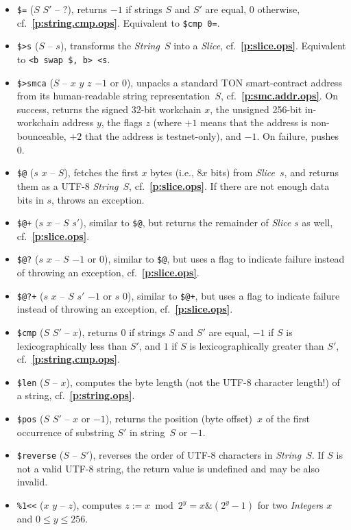 \documentclass[12pt,oneside]{article}
\def\refpoint#1{{\rm\textbf{\ref{#1}}}}
\let\ptref=\refpoint
\begin{document}
\begin{itemize}
\item {\tt \$=} ($S$ $S'$ -- $?$), returns $-1$ if strings $S$ and $S'$ are equal, $0$ otherwise, cf.~\ptref{p:string.cmp.ops}. Equivalent to {\tt \$cmp 0=}.
\item {\tt \$>s} ($S$ -- $s$), transforms the {\em String\/}~$S$ into a {\em Slice}, cf.~\ptref{p:slice.ops}. Equivalent to {\tt <b swap \$, b> <s}.
\item {\tt \$>smca} ($S$ -- $x$ $y$ $z$ $-1$ or $0$), unpacks a standard TON smart-contract address from its human-readable string representation~$S$, cf.~\ptref{p:smc.addr.ops}. On success, returns the signed 32-bit workchain $x$, the unsigned 256-bit in-workchain address $y$, the flags $z$ (where $+1$ means that the address is non-bounceable, $+2$ that the address is testnet-only), and $-1$. On failure, pushes $0$.
\item {\tt \$@} ($s$ $x$ -- $S$), fetches the first $x$ bytes (i.e., $8x$ bits) from {\em Slice}~$s$, and returns them as a UTF-8 {\em String\/}~$S$, cf.~\ptref{p:slice.ops}. If there are not enough data bits in $s$, throws an exception.
\item {\tt \$@+} ($s$ $x$ -- $S$ $s'$), similar to {\tt \$@}, but returns the remainder of {\em Slice\/} $s$ as well, cf.~\ptref{p:slice.ops}.
\item {\tt \$@?} ($s$ $x$ -- $S$ $-1$ or $0$), similar to {\tt \$@}, but uses a flag to indicate failure instead of throwing an exception, cf.~\ptref{p:slice.ops}.
\item {\tt \$@?+} ($s$ $x$ -- $S$ $s'$ $-1$ or $s$ $0$), similar to {\tt \$@+}, but uses a flag to indicate failure instead of throwing an exception, cf.~\ptref{p:slice.ops}.
\item {\tt \$cmp} ($S$ $S'$ -- $x$), returns $0$ if strings $S$ and $S'$ are equal, $-1$ if $S$ is lexicographically less than $S'$, and $1$ if $S$ is lexicographically greater than $S'$, cf.~\ptref{p:string.cmp.ops}.
\item {\tt \$len} ($S$ -- $x$), computes the byte length (not the UTF-8 character length!) of a string, cf.~\ptref{p:string.ops}.
\item {\tt \$pos} ($S$ $S'$ -- $x$ or $-1$), returns the position (byte offset)~$x$ of the first occurrence of substring $S'$ in string~$S$ or $-1$.
\item {\tt \$reverse} ($S$ -- $S'$), reverses the order of UTF-8 characters in {\em String\/}~$S$. If $S$ is not a valid UTF-8 string, the return value is undefined and may be also invalid.
\item {\tt \%1<{<}} ($x$ $y$ -- $z$), computes $z:=x\bmod 2^y=x\&(2^y-1)$ for two {\em Integer\/}s $x$ and $0\leq y\leq 256$.

\end{itemize}
\end{document}
